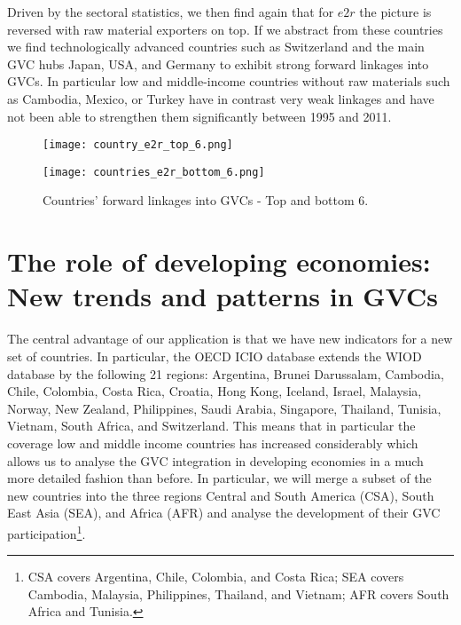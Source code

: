 \documentclass[11pt,a4paper]{article}
\begin{document}
Driven by the sectoral statistics, we then find again that for $e2r$ the picture is reversed with raw material exporters on top. If we abstract from these countries we find technologically advanced countries such as Switzerland and the main GVC hubs Japan, USA, and Germany to exhibit strong forward linkages into GVCs. In particular low and middle-income countries without raw materials such as Cambodia, Mexico, or Turkey have in contrast very weak linkages and have not been able to strengthen them significantly between 1995 and 2011.

\begin{figure}
\centering
\begin{minipage}{0.45\textwidth}
\centering
\texttt{[image: country\_e2r\_top\_6.png]}
\end{minipage}\hfill
\begin{minipage}{0.45\textwidth}
\centering
\texttt{[image: countries\_e2r\_bottom\_6.png]}
\end{minipage}
\caption{Countries' forward linkages into GVCs - Top and bottom 6.}
\label{fig:e2r_k}
\end{figure}



\section{The role of developing economies: New trends and patterns in GVCs}\label{sec:news}

The central advantage of our application is that we have new indicators for a new set of countries. In particular, the OECD ICIO database extends the WIOD database by the following 21 regions: Argentina, Brunei Darussalam, Cambodia, Chile, Colombia, Costa Rica, Croatia, Hong Kong, Iceland, Israel, Malaysia, Norway, New Zealand, Philippines, Saudi Arabia, Singapore, Thailand, Tunisia, Vietnam, South Africa, and Switzerland. This means that in particular the coverage low and middle income countries has increased considerably which allows us to analyse the GVC integration in developing economies in a much more detailed fashion than before. In particular, we will merge a subset of the new countries into the three regions Central and South America (CSA), South East Asia (SEA), and Africa (AFR) and analyse the development of their GVC participation\footnote{CSA covers Argentina, Chile, Colombia, and Costa Rica; SEA covers Cambodia, Malaysia, Philippines, Thailand, and Vietnam; AFR covers South Africa and Tunisia.}.
\end{document}
